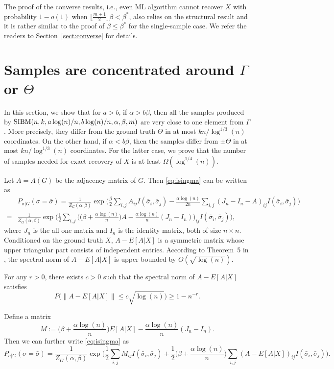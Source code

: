 \documentclass{article}
\begin{document}
The proof of the converse results, i.e., even ML algorithm cannot recover $X$ with probability $1-o(1)$ when $\lfloor \frac{m+1}{2} \rfloor \beta < \beta^\ast$, also relies on the structural result and it is rather similar to the proof of $\beta\le\beta^\ast$ for the single-sample case. We refer the readers to Section~\ref{sect:converse} for details.

\section{Samples are concentrated around $\Gamma$ or $\Theta$} \label{sect:aln}
In this section, we show that for $a>b$, if $\alpha>b\beta$, then all the samples produced by $\SIBM(n, k,\linebreak[4]
a\log(n)/n, b\log(n)/n,\alpha,\beta,m)$ are very close to one element from $\Gamma$. More precisely, they differ from the ground truth $\Theta$ in at most $kn/\log^{1/3}(n)$ coordinates.
On the other hand, if $\alpha<b\beta$, then the samples differ from  $\pm \Theta$ in at most $kn/\log^{1/3}(n)$ coordinates.
For the latter case, we prove that the number of samples needed for exact recovery of $X$ is at least $\Omega(\log^{1/4}(n))$.

Let $A=A(G)$ be the adjacency matrix of $G$. Then \eqref{eq:isingma} can be written as
\begin{align*}
& P_{\sigma|G}(\sigma=\bar{\sigma})=\frac{1}{Z_G(\alpha,\beta)}
\exp\Big(\frac{\beta}{2} \sum_{i,j} A_{ij} I(\bar{\sigma}_i,\bar{\sigma}_j)
-\frac{\alpha\log(n)}{2n} \sum_{i,j} (J_n-I_n-A)_{ij} I(\bar{\sigma}_i, \bar{\sigma}_j)
\Big)  \\
= & \frac{1}{Z_G(\alpha,\beta)}
\exp\Big( \frac{1}{2} \sum_{i,j} \Big( \big(\beta+\frac{\alpha\log(n)}{n} \big) A
-\frac{\alpha\log(n)}{n} (J_n-I_n) \Big)_{ij} I(\bar{\sigma}_i,\bar{\sigma}_j)
\Big),
\end{align*}
where $J_n$ is the all one matrix and $I_n$ is the identity matrix, both of size $n\times n$.
Conditioned on the ground truth $X$,
$A-E[A|X]$ is a symmetric matrix whose upper triangular part consists of independent entries. According to Theorem~5 in \cite{Hajek16}, the spectral norm of $A-E[A|X]$ is upper bounded by $O(\sqrt{\log(n)})$.
\begin{theorem} \label{thm:a2}
For any $r>0$, there exists $c>0$ such that the spectral norm of $A-E[A|X]$ satisfies
$$
P\big(\|A-E[A|X]\| \le c\sqrt{\log(n)} \big)\ge 1-n^{-r} .
$$
\end{theorem}
Define a matrix
$$
M:= \big(\beta+\frac{\alpha\log(n)}{n} \big) E[A|X]
-\frac{\alpha\log(n)}{n} (J_n-I_n).
$$
Then we can further write \eqref{eq:isingma}
as
\begin{equation} \label{eq:M}
P_{\sigma|G}(\sigma=\bar{\sigma})
= \frac{1}{Z_G(\alpha,\beta)}
\exp\Big( \frac{1}{2} \sum_{i,j}M_{ij} I(\bar{\sigma}_i, \bar{\sigma}_j) + \frac{1}{2}\big(\beta+\frac{\alpha\log(n)}{n} \big)  \sum_{i,j}  (A-E[A|X])_{ij}
 I(\bar{\sigma}_i, \bar{\sigma}_j)  
\Big)  .
\end{equation}
\end{document}
